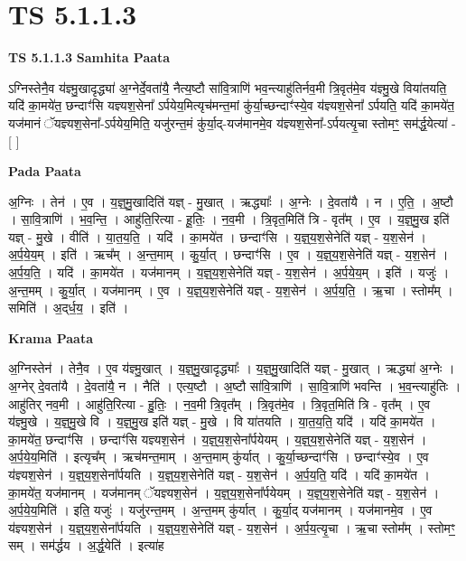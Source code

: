 \documentclass[17pt]{extarticle}
\begin{document}
\section{ TS 5.1.1.3 }

\textbf{TS 5.1.1.3 } \newline
\textbf{Samhita Paata} \newline

ऽग्निस्तेनै॒व य॑ज्ञ्मु॒खादृद्ध्या॑ अ॒ग्नेर्दे॒वता॑यै॒ नैत्य॒ष्टौ सा॑वि॒त्राणि॑ भव॒न्त्याहु॑तिर्नव॒मी त्रि॒वृत॑मे॒व य॑ज्ञ्मु॒खे विया॑तयति॒ यदि॑ का॒मये॑त॒ छन्दाꣳ॑सि यज्ञ्यश॒सेना᳚ ऽर्पयेय॒मित्यृच॑मन्त॒मां कु॑र्या॒च्छन्दाꣳ॑स्ये॒व य॑ज्ञ्यश॒सेना᳚ ऽर्पयति॒ यदि॑ का॒मये॑त॒ यज॑मानं ॅयज्ञ्यश॒सेना᳚-ऽर्पयेय॒मिति॒ यजु॑रन्त॒मं कु॑र्या॒द्-यज॑मानमे॒व य॑ज्ञ्यश॒सेना᳚-ऽर्पयत्यृ॒चा स्तोमꣳ॒॒ सम॑र्द्ध॒येत्या॑ - [  ] \newline

\textbf{Pada Paata} \newline

अ॒ग्निः । तेन॑ । ए॒व । य॒ज्ञ्॒मु॒खादिति॑ यज्ञ् - मु॒खात् । ऋद्ध्याः᳚ । अ॒ग्नेः । दे॒वता॑यै । न । ए॒ति॒ । अ॒ष्टौ । सा॒वि॒त्राणि॑ । भ॒व॒न्ति॒ । आहु॑ति॒रित्या - हू॒तिः॒ । न॒व॒मी । त्रि॒वृत॒मिति॑ त्रि - वृत᳚म् । ए॒व । य॒ज्ञ्॒मु॒ख इति॑ यज्ञ् - मु॒खे । वीति॑ । या॒त॒य॒ति॒ । यदि॑ । का॒मये॑त । छन्दाꣳ॑सि । य॒ज्ञ्॒य॒श॒सेनेति॑ यज्ञ् - य॒श॒सेन॑ । अ॒र्प॒ये॒य॒म् । इति॑ । ऋच᳚म् । अ॒न्त॒माम् । कु॒र्या॒त् । छन्दाꣳ॑सि । ए॒व । य॒ज्ञ्॒य॒श॒सेनेति॑ यज्ञ् - य॒श॒सेन॑ । अ॒र्प॒य॒ति॒ । यदि॑ । का॒मये॑त । यज॑मानम् । य॒ज्ञ्॒य॒श॒सेनेति॑ यज्ञ् - य॒श॒सेन॑ । अ॒र्प॒ये॒य॒म् । इति॑ । यजुः॑ । अ॒न्त॒मम् । कु॒र्या॒त् । यज॑मानम् । ए॒व । य॒ज्ञ्॒य॒श॒सेनेति॑ यज्ञ् - य॒श॒सेन॑ । अ॒र्प॒य॒ति॒ । ऋ॒चा । स्तोम᳚म् । समिति॑ । अ॒द्‌र्ध॒य॒ । इति॑ ।  \newline


\textbf{Krama Paata} \newline

अ॒ग्निस्तेन॑ । तेनै॒व । ए॒व य॑ज्ञ्मु॒खात् । य॒ज्ञ्॒मु॒खादृद्ध्याः᳚ । य॒ज्ञ्॒मु॒खादिति॑ यज्ञ् - मु॒खात् । ऋद्ध्या॑ अ॒ग्नेः । अ॒ग्नेर् दे॒वता॑यै । दे॒वता॑यै॒ न । नैति॑ । एत्य॒ष्टौ । अ॒ष्टौ सा॑वि॒त्राणि॑ । सा॒वि॒त्राणि॑ भवन्ति । भ॒व॒न्त्याहु॑तिः । आहु॑तिर् नव॒मी । आहु॑ति॒रित्या - हु॒तिः॒ । न॒व॒मी त्रि॒वृत᳚म् । त्रि॒वृत॑मे॒व । त्रि॒वृत॒मिति॑ त्रि - वृत᳚म् । ए॒व य॑ज्ञ्मु॒खे । य॒ज्ञ्॒मु॒खे वि । य॒ज्ञ्॒मु॒ख इति॑ यज्ञ् - मु॒खे । वि या॑तयति । या॒त॒य॒ति॒ यदि॑ । यदि॑ का॒मये॑त । का॒मये॑त॒ छन्दाꣳ॑सि । छन्दाꣳ॑सि यज्ञ्यश॒सेन॑ । य॒ज्ञ्॒य॒श॒सेना᳚र्पयेयम् । य॒ज्ञ्॒य॒श॒सेनेति॑ यज्ञ् - य॒श॒सेन॑ । अ॒र्प॒ये॒य॒मिति॑ । इत्यृच᳚म् । ऋच॑मन्त॒माम् । अ॒न्त॒माम् कु॑र्यात् । कु॒र्या॒च्छन्दाꣳ॑सि । छन्दाꣳ॑स्ये॒व । ए॒व य॑ज्ञ्यश॒सेन॑ । य॒ज्ञ्॒य॒श॒सेना᳚र्पयति । य॒ज्ञ्॒य॒श॒सेनेति॑ यज्ञ् - य॒श॒सेन॑ । अ॒र्प॒य॒ति॒ यदि॑ । यदि॑ का॒मये॑त । का॒मये॑त॒ यज॑मानम् । यज॑मानम् ॅयज्ञ्यश॒सेन॑ । य॒ज्ञ्॒य॒श॒सेना᳚र्पयेयम् । य॒ज्ञ्॒य॒श॒सेनेति॑ यज्ञ् - य॒श॒सेन॑ । अ॒र्प॒ये॒य॒मिति॑ । इति॒ यजुः॑ । यजु॑रन्त॒मम् । अ॒न्त॒मम् कु॑र्यात् । कु॒र्या॒द् यज॑मानम् । यज॑मानमे॒व । ए॒व य॑ज्ञ्यश॒सेन॑ । य॒ज्ञ्॒य॒श॒सेना᳚र्पयति । य॒ज्ञ्॒य॒श॒सेनेति॑ यज्ञ् - य॒श॒सेन॑ । अ॒र्प॒य॒त्यृ॒चा । ऋ॒चा स्तोम᳚म् । स्तोमꣳ॒॒ सम् । सम॑र्द्धय । अ॒र्द्ध॒येति॑ । इत्या॑ह \newline
\end{document}
